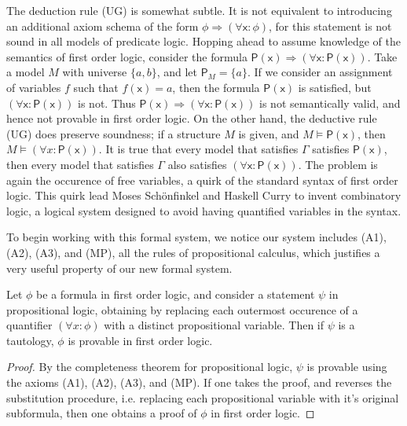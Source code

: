 \begin{remark}
    The deduction rule (UG) is somewhat subtle. It is not equivalent to introducing an additional axiom schema of the form $\phi \Rightarrow (\forall \mathsf{x}: \phi)$, for this statement is not sound in all models of predicate logic. Hopping ahead to assume knowledge of the semantics of first order logic, consider the formula $\mathsf{P(x) \Rightarrow (\forall x: P(x))}$. Take a model $M$ with universe $\{ a, b \}$, and let $\mathsf{P}_M = \{ a \}$. If we consider an assignment of variables $f$ such that $f( \mathsf{x} ) = a$, then the formula $\mathsf{P(x)}$ is satisfied, but $\mathsf{(\forall x: P(x))}$ is not. Thus $\mathsf{P(x) \Rightarrow (\forall x: P(x))}$ is not semantically valid, and hence not provable in first order logic. On the other hand, the deductive rule (UG) does preserve soundness; if a structure $M$ is given, and $M \vDash \mathsf{P(x)}$, then $M \vDash (\forall x: \mathsf{P(x)})$. It is true that every model that satisfies $\Gamma$ satisfies $\mathsf{P(x)}$, then every model that satisfies $\Gamma$ also satisfies $\mathsf{(\forall x: P(x))}$. The problem is again the occurence of free variables, a quirk of the standard syntax of first order logic. This quirk lead Moses Sch\"{o}nfinkel and Haskell Curry to invent combinatory logic, a logical system designed to avoid having quantified variables in the syntax.
\end{remark}

To begin working with this formal system, we notice our system includes (A1), (A2), (A3), and (MP), all the rules of propositional calculus, which justifies a very useful property of our new formal system.

\begin{theorem}
    Let $\phi$ be a formula in first order logic, and consider a statement $\psi$ in propositional logic, obtaining by replacing each outermost occurence of a quantifier $(\forall x: \phi)$ with a distinct propositional variable. Then if $\psi$ is a tautology, $\phi$ is provable in first order logic.
\end{theorem}
\begin{proof}
    By the completeness theorem for propositional logic, $\psi$ is provable using the axioms (A1), (A2), (A3), and (MP). If one takes the proof, and reverses the substitution procedure, i.e. replacing each propositional variable with it's original subformula, then one obtains a proof of $\phi$ in first order logic.
\end{proof}

